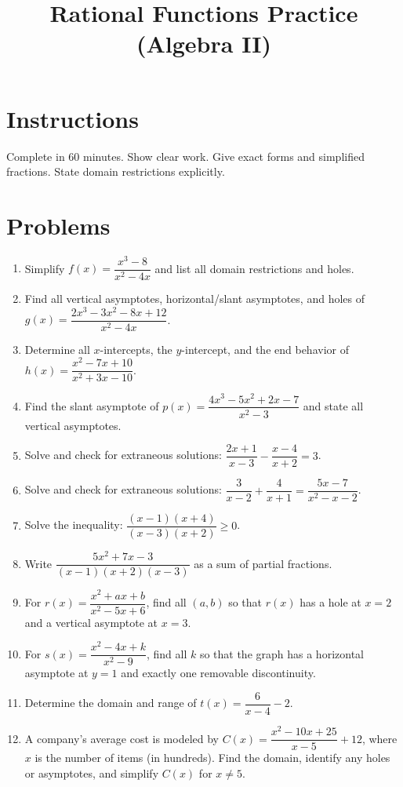 \documentclass[12pt]{article}
\title{Rational Functions Practice (Algebra II)}
\author{}
\date{}
\begin{document}
\maketitle

\section*{Instructions}
Complete in 60 minutes. Show clear work. Give exact forms and simplified fractions. State domain restrictions explicitly.

\section*{Problems}
\begin{enumerate}
  \item Simplify $f(x)=\dfrac{x^3-8}{x^2-4x}$ and list all domain restrictions and holes.
  \item Find all vertical asymptotes, horizontal/slant asymptotes, and holes of $g(x)=\dfrac{2x^3-3x^2-8x+12}{x^2-4x}$.
  \item Determine all $x$-intercepts, the $y$-intercept, and the end behavior of $h(x)=\dfrac{x^2-7x+10}{x^2+3x-10}$.
  \item Find the slant asymptote of $p(x)=\dfrac{4x^3-5x^2+2x-7}{x^2-3}$ and state all vertical asymptotes.
  \item Solve and check for extraneous solutions: $\dfrac{2x+1}{x-3}-\dfrac{x-4}{x+2}=3$.
  \item Solve and check for extraneous solutions: $\dfrac{3}{x-2}+\dfrac{4}{x+1}=\dfrac{5x-7}{x^2-x-2}$.
  \item Solve the inequality: $\dfrac{(x-1)(x+4)}{(x-3)(x+2)}\ge 0$.
  \item Write $\dfrac{5x^2+7x-3}{(x-1)(x+2)(x-3)}$ as a sum of partial fractions.
  \item For $r(x)=\dfrac{x^2+ax+b}{x^2-5x+6}$, find all $(a,b)$ so that $r(x)$ has a hole at $x=2$ and a vertical asymptote at $x=3$.
  \item For $s(x)=\dfrac{x^2-4x+k}{x^2-9}$, find all $k$ so that the graph has a horizontal asymptote at $y=1$ and exactly one removable discontinuity.
  \item Determine the domain and range of $t(x)=\dfrac{6}{x-4}-2$.
  \item A company’s average cost is modeled by $C(x)=\dfrac{x^2-10x+25}{x-5}+12$, where $x$ is the number of items (in hundreds). Find the domain, identify any holes or asymptotes, and simplify $C(x)$ for $x\ne 5$.
\end{enumerate}
\end{document}
